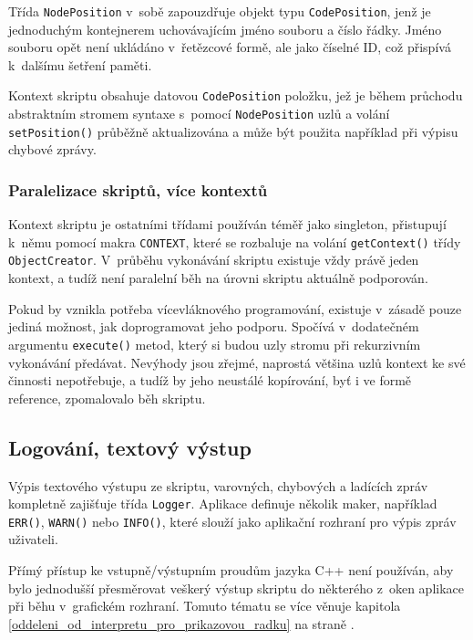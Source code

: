 \documentclass[11pt,twoside,a4paper]{book}
\begin{document}
Třída \texttt{NodePosition} v~sobě zapouzdřuje objekt typu \texttt{CodePosition}, jenž je jednoduchým kontejnerem uchovávajícím jméno souboru a číslo řádky. Jméno souboru opět není ukládáno v~řetězcové formě, ale jako číselné ID, což přispívá k~dalšímu šetření paměti.

Kontext skriptu obsahuje datovou \texttt{CodePosition} položku, jež je během průchodu abs\-trakt\-ním stromem syntaxe s~pomocí \texttt{NodePosition} uzlů a volání \texttt{setPosition()} průběžně aktualizována a může být použita například při výpisu chybové zprávy.


\subsubsection{Paralelizace skriptů, více kontextů}

Kontext skriptu je ostatními třídami používán téměř jako singleton, přistupují k~němu pomocí makra \texttt{CONTEXT}, které se rozbaluje na volání \texttt{getContext()} třídy \texttt{ObjectCreator}. V~průběhu vykonávání skriptu existuje vždy právě jeden kontext, a tudíž není paralelní běh na úrovni skriptu aktuálně podporován.

Pokud by vznikla potřeba vícevláknového programování, existuje v~zásadě pouze jediná mož\-nost, jak doprogramovat jeho podporu. Spočívá v~dodatečném argumentu \texttt{execute()} metod, který si budou uzly stromu při rekurzivním vykonávání předávat. Nevýhody jsou zřejmé, naprostá většina uzlů kontext ke své činnosti nepotřebuje, a tudíž by jeho neustálé kopírování, byť i ve formě reference, zpomalovalo běh skriptu.


\subsection{Logování, textový výstup}

Výpis textového výstupu ze skriptu, varovných, chybových a ladících zpráv kompletně za\-jiš\-ťu\-je třída \texttt{Logger}. Aplikace definuje několik maker, například \texttt{ERR()}, \texttt{WARN()} nebo \texttt{INFO()}, které slouží jako aplikační rozhraní pro výpis zpráv uživateli.

Přímý přístup ke vstupně/výstupním proudům jazyka C++ není používán, aby bylo jednodušší přesměrovat veškerý výstup skriptu do některého z~oken aplikace při běhu v~grafickém rozhraní. Tomuto tématu se více věnuje kapitola \ref{oddeleni_od_interpretu_pro_prikazovou_radku} na straně \pageref{oddeleni_od_interpretu_pro_prikazovou_radku}.
\end{document}
